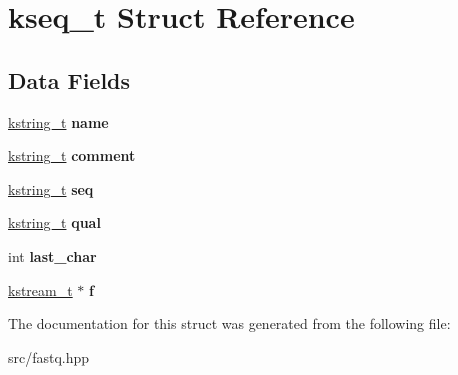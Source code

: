 \hypertarget{structkseq__t}{}\section{kseq\+\_\+t Struct Reference}
\label{structkseq__t}
\subsection*{Data Fields}
\begin{DoxyCompactItemize}
\item 
\mbox{\label{structkseq__t_a04f38d70ab623c59b09fd2da0c45065c}} 
\hyperlink{struct____kstring__t}{kstring\+\_\+t} {\bfseries name}
\item 
\mbox{\label{structkseq__t_a79d9536ff4818965a2cf5cc46f8996e3}} 
\hyperlink{struct____kstring__t}{kstring\+\_\+t} {\bfseries comment}
\item 
\mbox{\label{structkseq__t_aeab6331e5d4f01f17737d3d74fd5cc77}} 
\hyperlink{struct____kstring__t}{kstring\+\_\+t} {\bfseries seq}
\item 
\mbox{\label{structkseq__t_acdd7efc8ee0b661771634c3084688943}} 
\hyperlink{struct____kstring__t}{kstring\+\_\+t} {\bfseries qual}
\item 
\mbox{\label{structkseq__t_a9bce7477b37423f1e8e3689b98c300a1}} 
int {\bfseries last\+\_\+char}
\item 
\mbox{\label{structkseq__t_a986116a305f38fd757d625b058061708}} 
\hyperlink{struct____kstream__t}{kstream\+\_\+t} $\ast$ {\bfseries f}
\end{DoxyCompactItemize}


The documentation for this struct was generated from the following file\+:\begin{DoxyCompactItemize}
\item 
src/fastq.\+hpp\end{DoxyCompactItemize}
